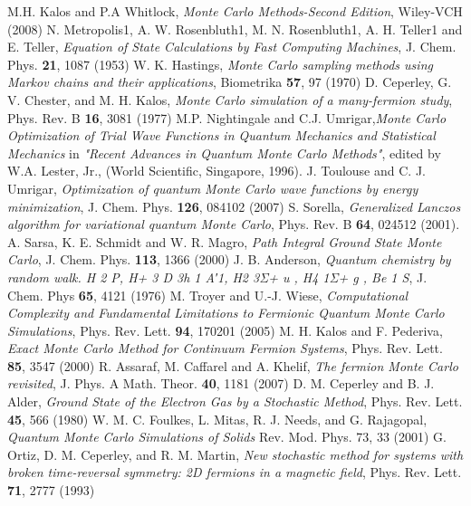 \begin{thebibliography}{99.}%
M.H. Kalos and P.A Whitlock, \emph{Monte Carlo Methods-Second Edition}, Wiley-VCH (2008)
N. Metropolis1, A. W. Rosenbluth1, M. N. Rosenbluth1, A. H. Teller1 and E. Teller, \emph{Equation of State Calculations by Fast Computing Machines}, J. Chem. Phys. {\bf 21}, 1087 (1953)
W. K. Hastings, \emph{Monte Carlo sampling methods using Markov chains and their applications}, Biometrika {\bf 57}, 97 (1970)
D. Ceperley, G. V. Chester, and M. H. Kalos, \emph{Monte Carlo simulation of a many-fermion study}, Phys. Rev. B {\bf 16}, 3081 (1977)
M.P. Nightingale and C.J. Umrigar,\emph{Monte Carlo Optimization of Trial Wave Functions in Quantum Mechanics and Statistical Mechanics} in \emph{"Recent Advances in Quantum Monte Carlo Methods"}, edited by W.A. Lester, Jr., (World Scientific, Singapore, 1996). 
J. Toulouse and C. J. Umrigar, \emph{Optimization of quantum Monte Carlo wave functions by energy minimization}, J. Chem. Phys. {\bf 126}, 084102 (2007)
S. Sorella, {\em Generalized Lanczos algorithm for variational quantum Monte Carlo}, Phys. Rev. B {\bf 64}, 024512 (2001).
A. Sarsa, K. E. Schmidt and W. R. Magro, \emph{Path Integral Ground State Monte Carlo}, J. Chem. Phys. {\bf 113}, 1366 (2000)
J. B. Anderson, \emph{Quantum chemistry by random walk. H 2 P, H+ 3 D 3h 1 A′1, H2 3Σ+ u , H4 1Σ+ g , Be 1 S}, J. Chem. Phys {\bf 65}, 4121 (1976)
M. Troyer and U.-J. Wiese, \emph{Computational Complexity and Fundamental Limitations to Fermionic Quantum Monte Carlo Simulations}, Phys. Rev. Lett. {\bf 94}, 170201 (2005)
M. H. Kalos and F. Pederiva, \emph{Exact Monte Carlo Method for Continuum Fermion Systems}, Phys. Rev. Lett. {\bf 85}, 3547 (2000)
R. Assaraf, M. Caffarel and A. Khelif, \emph{The fermion Monte Carlo revisited}, J. Phys. A Math. Theor. {\bf 40}, 1181 (2007)
D. M. Ceperley and B. J. Alder, \emph{ Ground State of the Electron Gas by a Stochastic Method}, Phys. Rev. Lett. {\bf 45}, 566 (1980)
W. M. C. Foulkes, L. Mitas, R. J. Needs, and G. Rajagopal, \emph{Quantum Monte Carlo Simulations of Solids} Rev. Mod. Phys. 73, 33 (2001)
G. Ortiz, D. M. Ceperley, and R. M. Martin, \emph{New stochastic method for systems with broken time-reversal symmetry: 2D fermions in a magnetic field}, Phys. Rev. Lett. {\bf 71}, 2777 (1993)

\end{thebibliography}
